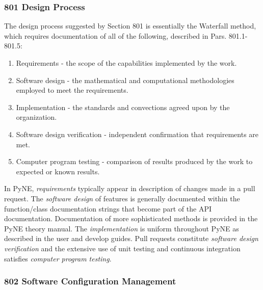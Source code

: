 \documentclass{anstrans}
\begin{document}
\subsubsection{801 Design Process}

The design process suggested by Section 801 is essentially the Waterfall method, which requires documentation of all of the following, described in Pars. 801.1-801.5:

\begin{enumerate} 
\item{Requirements - the scope of the capabilities implemented by the work.}
\item{Software design - the mathematical and computational methodologies employed to meet the requirements.}
\item{Implementation - the standards and convections agreed upon by the organization.}
\item{Software design verification - independent confirmation that requirements are met.}
\item{Computer program testing - comparison of results produced by the work to expected or known results.}
\end{enumerate}

In PyNE, \emph{requirements} typically appear in description of changes made in
a pull request. The \emph{software design} of features is generally documented
within the function/class documentation strings that become part of the API
documentation. Documentation of more sophisticated methods is provided in the PyNE
theory manual. The \emph{implementation} is uniform throughout PyNE as described
in the user and develop guides. Pull requests constitute \emph{software design
verification} and the extensive use of unit testing and continuous integration
satisfies \emph{computer program testing}.


\subsubsection{802 Software Configuration Management}
\end{document}
